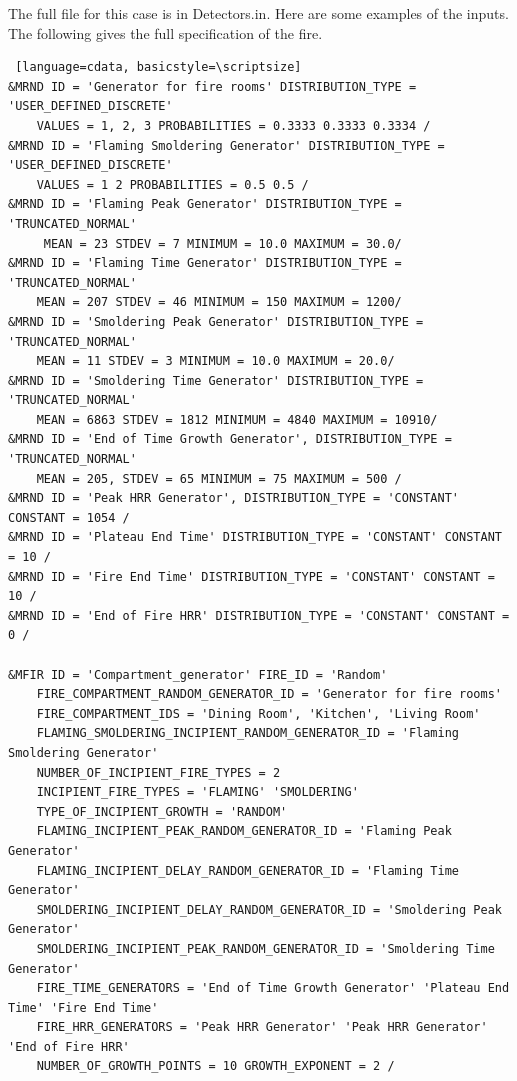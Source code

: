 \documentclass[12pt,twoside]{book}
\begin{document}
The full file for this case is in Detectors.in. Here are some examples of the inputs. The following gives the full specification of the fire.

\vspace{\baselineskip}
\begin{lstlisting} [language=cdata, basicstyle=\scriptsize]
&MRND ID = 'Generator for fire rooms' DISTRIBUTION_TYPE = 'USER_DEFINED_DISCRETE'
	VALUES = 1, 2, 3 PROBABILITIES = 0.3333 0.3333 0.3334 /
&MRND ID = 'Flaming Smoldering Generator' DISTRIBUTION_TYPE = 'USER_DEFINED_DISCRETE'
	VALUES = 1 2 PROBABILITIES = 0.5 0.5 /
&MRND ID = 'Flaming Peak Generator' DISTRIBUTION_TYPE = 'TRUNCATED_NORMAL'
	 MEAN = 23 STDEV = 7 MINIMUM = 10.0 MAXIMUM = 30.0/
&MRND ID = 'Flaming Time Generator' DISTRIBUTION_TYPE = 'TRUNCATED_NORMAL'
	MEAN = 207 STDEV = 46 MINIMUM = 150 MAXIMUM = 1200/
&MRND ID = 'Smoldering Peak Generator' DISTRIBUTION_TYPE = 'TRUNCATED_NORMAL'
	MEAN = 11 STDEV = 3 MINIMUM = 10.0 MAXIMUM = 20.0/
&MRND ID = 'Smoldering Time Generator' DISTRIBUTION_TYPE = 'TRUNCATED_NORMAL'
	MEAN = 6863 STDEV = 1812 MINIMUM = 4840 MAXIMUM = 10910/
&MRND ID = 'End of Time Growth Generator', DISTRIBUTION_TYPE = 'TRUNCATED_NORMAL'
	MEAN = 205, STDEV = 65 MINIMUM = 75 MAXIMUM = 500 /
&MRND ID = 'Peak HRR Generator', DISTRIBUTION_TYPE = 'CONSTANT' CONSTANT = 1054 /
&MRND ID = 'Plateau End Time' DISTRIBUTION_TYPE = 'CONSTANT' CONSTANT = 10 /
&MRND ID = 'Fire End Time' DISTRIBUTION_TYPE = 'CONSTANT' CONSTANT = 10 /
&MRND ID = 'End of Fire HRR' DISTRIBUTION_TYPE = 'CONSTANT' CONSTANT = 0 /

&MFIR ID = 'Compartment_generator' FIRE_ID = 'Random'
	FIRE_COMPARTMENT_RANDOM_GENERATOR_ID = 'Generator for fire rooms'
    FIRE_COMPARTMENT_IDS = 'Dining Room', 'Kitchen', 'Living Room'
    FLAMING_SMOLDERING_INCIPIENT_RANDOM_GENERATOR_ID = 'Flaming Smoldering Generator'
	NUMBER_OF_INCIPIENT_FIRE_TYPES = 2
    INCIPIENT_FIRE_TYPES = 'FLAMING' 'SMOLDERING'
	TYPE_OF_INCIPIENT_GROWTH = 'RANDOM'
	FLAMING_INCIPIENT_PEAK_RANDOM_GENERATOR_ID = 'Flaming Peak Generator'
    FLAMING_INCIPIENT_DELAY_RANDOM_GENERATOR_ID = 'Flaming Time Generator'
    SMOLDERING_INCIPIENT_DELAY_RANDOM_GENERATOR_ID = 'Smoldering Peak Generator'
    SMOLDERING_INCIPIENT_PEAK_RANDOM_GENERATOR_ID = 'Smoldering Time Generator'
	FIRE_TIME_GENERATORS = 'End of Time Growth Generator' 'Plateau End Time' 'Fire End Time'
	FIRE_HRR_GENERATORS = 'Peak HRR Generator' 'Peak HRR Generator' 'End of Fire HRR'
    NUMBER_OF_GROWTH_POINTS = 10 GROWTH_EXPONENT = 2 /
\end{lstlisting}
\end{document}
